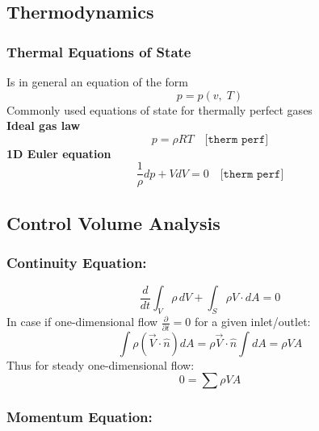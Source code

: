 \subsection*{Thermodynamics}

\subsubsection*{Thermal Equations of State}
	Is in general an equation of the form
	\begin{equation}
		p=p(v,\;T)
	\end{equation}
	Commonly used equations of state for thermally perfect gases\\
	\textbf{Ideal gas law}
	\begin{equation}
		p = \rho RT \quad \texttt{[therm perf]}
	\end{equation}
	\textbf{1D Euler equation}
	\begin{equation}
		\frac{1}{\rho} dp + V dV = 0 \quad \texttt{[therm perf]}
	\end{equation}

\subsection*{Control Volume Analysis}

\subsubsection*{Continuity Equation:}

	\begin{equation}
		\frac{d}{dt} \int_V \rho \, dV + \int_S \rho V \cdot dA = 0
	\end{equation}
	In case if one-dimensional flow $\frac{\partial}{\partial t} = 0$ for a given inlet/outlet:
	\begin{equation}
		\int \rho (\vec{V} \cdot \hat{n} )d A = \rho\vec{V}\cdot \hat{n} \int d A = \rho V A
	\end{equation}\label{eq:1-d-massflow}
	\noindent Thus for steady one-dimensional flow:
	\begin{equation}
		0 = \sum \rho V A
	\end{equation}

\subsubsection*{Momentum Equation:}

